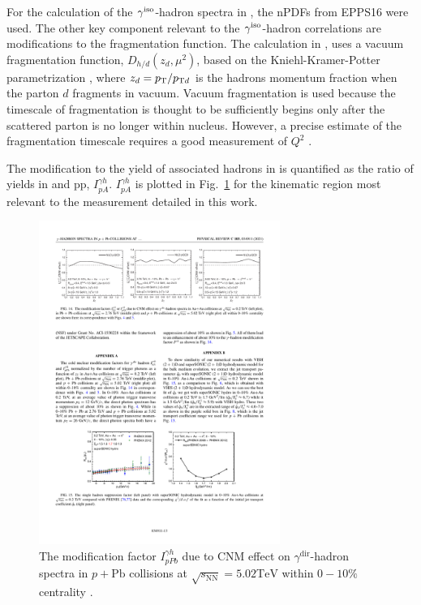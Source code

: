 For the calculation of the $\gamma^\mathrm{iso}$-hadron spectra in \cite{Xie2021}, the nPDFs from EPPS16 were used. The other key component relevant to the $\gamma^\mathrm{iso}$-hadron correlations are modifications to the fragmentation function. The calculation in \cite{Xie2021}, uses a vacuum fragmentation function, $D_{h / d}\left(z_{d}, \mu^{2}\right)$, based on the Kniehl-Kramer-Potter parametrization \cite{Kniehl2000}, where $z_d=p_{\mathrm{T}}/p_{\mathrm{T}d}$ is the hadrons momentum fraction when the parton $d$ fragments in vacuum. Vacuum fragmentation is used because the timescale of fragmentation is thought to be sufficiently begins only after the scattered parton is no longer within nucleus. However, a precise estimate of the fragmentation timescale requires a good measurement of $Q^2$ \cite{Sasabe1980}.



The modification to the yield of associated hadrons in \pPb is quantified as the ratio of yields in \pPb and pp, $I_{pA}^{\gamma h}$. $I_{pA}^{\gamma h}$ is plotted in Fig.~\ref{fig:cnm_Iaa} for the kinematic region most relevant to the measurement detailed in this work.
\begin{figure}[htpb]
  \centering
  \includegraphics[width=0.7\textwidth]{cnm_Iaa}
  \caption{The modification factor $I_{p P b}^{\gamma h}$ due to CNM effect on $\gamma^{\text {dir}}$-hadron spectra in $p+\mathrm{Pb}$ collisions at $\sqrt{s_{\mathrm{NN}}}=5.02 \mathrm{TeV}$ within $0-10 \%$ centrality \cite{Xie2021}.}
  \label{fig:cnm_Iaa}
\end{figure} 

